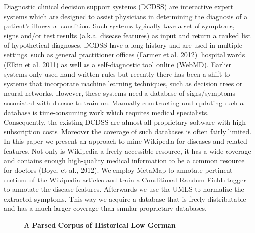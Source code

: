 \documentclass[10pt, a4paper, twopage, headinclude, footinclude, BCOR5mm]{scrartcl}
\begin{document}
\noindent
Diagnostic clinical decision support systems (DCDSS) are interactive expert systems which are designed to assist physicians in determining the diagnosis of a patient's illness or condition. Such systems typically take a set of symptoms, signs and/or test results (a.k.a. disease features) as input and return a ranked list of hypothetical diagnoses.  DCDSS have a long history and are used in multiple settings, such as general practitioner offices (Farmer et al. 2012), hospital wards (Elkin et al. 2011) as well as a self-diagnostic tool online (WebMD). Earlier systems only used hand-written rules but recently there has been a shift to systems that incorporate machine learning techniques, such as decision trees or neural networks.  However, these systems need a database of signs/symptoms associated with disease to train on. Manually constructing and updating such a database is time-consuming work which requires medical specialists. Consequently, the existing DCDSS are almost all proprietary software with high subscription costs. Moreover the coverage of such databases is often fairly limited.  In this paper we present an approach to mine Wikipedia for diseases and related features. Not only is Wikipedia a freely accessible resource, it has a wide coverage and contains enough high-quality medical information to be a common resource for doctors (Boyer et al., 2012). We employ MetaMap to annotate pertinent sections of the Wikipedia articles and train a Conditional Random Fields tagger to annotate the disease features. Afterwards we use the UMLS to normalize the extracted symptoms. This way we acquire a database that is freely distributable and has a much larger coverage than similar proprietary databases.


\newpage

\begin{figure}[t!]
\centering
\large\textbf{A Parsed Corpus of Historical Low German}
\vspace*{0.5cm}
\end{figure}


        \begin{table}[t!]
    \end{table}
\end{document}
